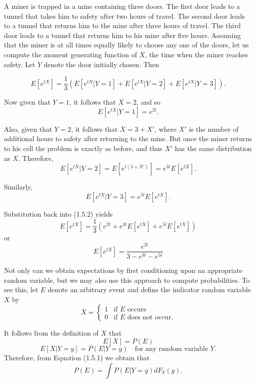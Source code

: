 \documentclass[lang=cn,10pt]{elegantbook}
\begin{document}
\begin{example}
	A miner is trapped in a mine containing three doors. The first door leads to a tunnel that takes him to safety after two hours of travel. The second door leads to a tunnel that returns him to the mine after three hours of travel. The third door leads to a tunnel that returns him to his mine after five hours. Assuming that the miner is at all times equally likely to choose any one of the doors, let us compute the moment generating function of $X$, the time when the miner reaches safety. Let $Y$ denote the door initially chosen. Then

\begin{equation}
E[e^{tX}] = \frac{1}{3}(E[e^{tX} | Y = 1] + E[e^{tX} | Y = 2] + E[e^{tX} | Y = 3]).
\end{equation}

Now given that $Y = 1$, it follows that $X = 2$, and so
\[
E[e^{tX} | Y = 1] = e^{2t}.
\]

Also, given that $Y = 2$, it follows that $X = 3 + X'$, where $X'$ is the number of additional hours to safety after returning to the mine. But once the miner returns to his cell the problem is exactly as before, and thus $X'$ has the same distribution as $X$. Therefore,
\[
E[e^{tX} | Y = 2] = E[e^{t(3 + X')}] = e^{3t} E[e^{tX}].
\]

Similarly,
\[
E[e^{tX} | Y = 3] = e^{5t} E[e^{tX}].
\]

Substitution back into (1.5.2) yields
\begin{equation}
E[e^{tX}] = \frac{1}{3}(e^{2t} + e^{3t}E[e^{tX}] + e^{5t}E[e^{tX}])
\end{equation}
or
\[
E[e^{tX}] = \frac{e^{2t}}{3 - e^{3t} - e^{5t}}
\]

Not only can we obtain expectations by first conditioning upon an appropriate random variable, but we may also use this approach to compute probabilities. To see this, let $E$ denote an arbitrary event and define the indicator random variable $X$ by
\[
X = \begin{cases}
1 & \text{if } E \text{ occurs} \\
0 & \text{if } E \text{ does not occur}.
\end{cases}
\]

It follows from the definition of $X$ that
\[
E[X] = P(E)
\]
\[
E[X | Y = y] = P(E | Y = y) \quad \text{for any random variable } Y.
\]
Therefore, from Equation (1.5.1) we obtain that
\[
P(E) = \int P(E | Y = y) dF_Y(y).
\]
\end{example}
\end{document}
